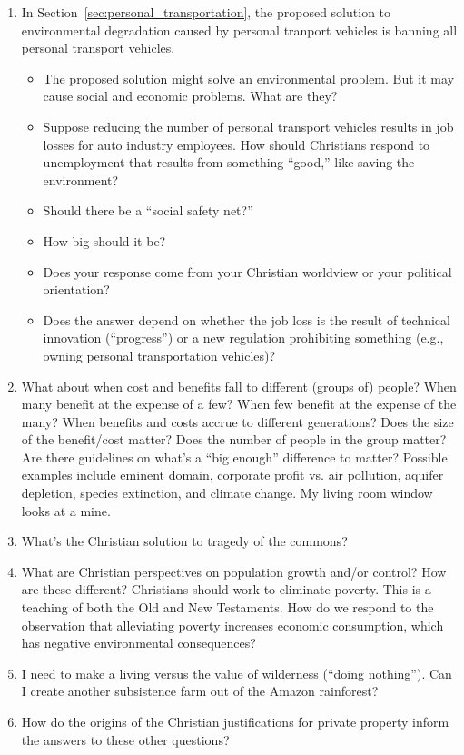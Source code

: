 \documentclass[12pt]{article}
\begin{document}
\begin{enumerate}
	
  \item In Section~\ref{sec:personal_transportation}, 
        the proposed solution to environmental degradation caused by 
        personal tranport vehicles is banning all personal transport vehicles.
		\begin{itemize}

		  \item The proposed solution might solve an environmental problem. 
		        But it may cause social and economic problems. What are they?

		  \item Suppose reducing the number of personal transport vehicles 
		        results in job losses for auto industry employees. 
				How should Christians respond to unemployment that results 
				from something ``good,'' like saving the environment? 

		  \item	Should there be a ``social safety net?'' 
		  
		  \item How big should it be? 
		  
		  \item Does your response come from your Christian worldview or your political orientation?  
		  
		  \item Does the answer depend on whether the job loss is the result 
		        of technical innovation (``progress'') or a new regulation 
				prohibiting something (e.g., owning personal transportation vehicles)?

		\end{itemize}

	\item What about when cost and benefits fall to different (groups of) people? When many benefit at the expense of a few? When few benefit at the expense of the many? When benefits and costs accrue to different generations? Does the size of the benefit/cost matter? Does the number of people in the group matter? Are there guidelines on what’s a “big enough” difference to matter? Possible examples include eminent domain, corporate profit vs. air pollution, aquifer depletion, species extinction, and climate change. My living room window looks at a mine.
	\item What’s the Christian solution to tragedy of the commons?
	\item What are Christian perspectives on population growth and/or control? How are these different?
	Christians should work to eliminate poverty. This is a teaching of both the Old and New Testaments. How do we respond to the observation that alleviating poverty increases economic consumption, which has negative environmental consequences?
	\item I need to make a living versus the value of wilderness (“doing nothing”). Can I create another subsistence farm out of the Amazon rainforest?
	\item How do the origins of the Christian justifications for private property inform the answers to these other questions?


\end{enumerate}
\end{document}
